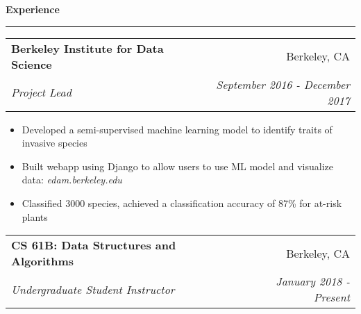 \documentclass[11pt,letterpaper]{article}
\makeatletter
\newenvironment{topic}[1]
    {
    {\Large \centerline{#1}}
    \vspace*{0.03in}
    \hrule 
    \vspace*{0.05in}
    }
    {}
\newenvironment{event}
    {
    \begin{tabular*}{\textwidth}{l@{\extracolsep{\fill}}r}
    }
    {
    \end{tabular*}
    }
\makeatother
\begin{document}
\begin{topic}{\textbf{Experience}}
        \begin{event}
            \textbf{Berkeley Institute for Data Science} & Berkeley, CA \\
            \emph{Project Lead} & \emph{September 2016 - December 2017} \\
        \end{event}
            \begin{itemize}
                \item Developed a semi-supervised machine learning model to identify traits of invasive species
                \item Built webapp using Django to allow users to use ML model and visualize data: \emph{edam.berkeley.edu}
                \item Classified 3000 species, achieved a classification accuracy of 87\% for at-risk plants
            \end{itemize}

        \begin{event}
            \textbf{CS 61B: Data Structures and Algorithms} & Berkeley, CA \\
            \emph{Undergraduate Student Instructor} & \emph{January 2018 - Present}
        \end{event}
        
        
    \end{topic} 
\end{document}
